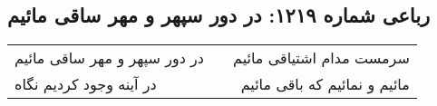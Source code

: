 \begin{center}
\section*{رباعی شماره ۱۲۱۹: در دور سپهر و مهر ساقی مائیم}
\label{sec:1219}
\begin{longtable}{l p{0.5cm} r}
در دور سپهر و مهر ساقی مائیم
&&
سرمست مدام اشتیاقی مائیم
\\
در آینه وجود کردیم نگاه
&&
مائیم و نمائیم که باقی مائیم
\\
\end{longtable}
\end{center}
